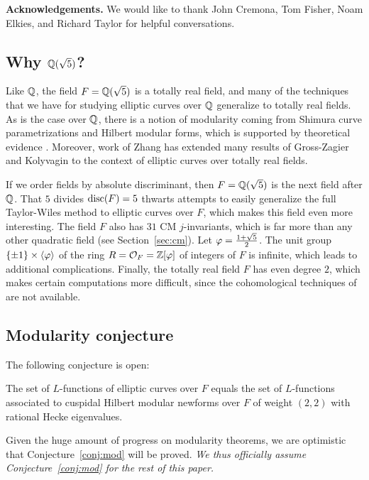 \documentclass{amsart}
\begin{document}
{\bf Acknowledgements.} We would like
to thank John Cremona, Tom Fisher, Noam Elkies, and Richard Taylor
for helpful conversations.
 
\subsection{Why $\mathbb{Q}(\sqrt{5})$?}

Like $\mathbb{Q}$, the field $F=\mathbb{Q}(\sqrt{5})$ is a totally real field, and
many of the techniques that we have for studying elliptic curves over
$\mathbb{Q}$ generalize to totally real
fields.
As is the case over $\mathbb{Q}$, there is a 
notion of modularity coming from Shimura curve
parametrizations and Hilbert modular forms, which is supported by
theoretical evidence \cite{}.%
Moreover,  work \cite{zhang:heightsshimura} of Zhang has extended many results
of Gross-Zagier \cite{gross-zagier} and Kolyvagin \cite{kolyvagin:mordellweil} 
to the context of elliptic curves over totally real fields.

If we order fields by absolute discriminant, then $F=\mathbb{Q}(\sqrt{5})$ is
the next field after $\mathbb{Q}$.  That $5$ divides $\operatorname{disc}(F)=5$ thwarts
attempts to easily generalize the full Taylor-Wiles method to elliptic
curves over $F$, which makes this field even more interesting.  The
field $F$ also has $31$ CM $j$-invariants, which is far more than any
other quadratic field (see Section~\ref{sec:cm}).  Let
$\varphi=\frac{1+\sqrt{5}}{2}$.  The unit group $\{\pm 1\} \times
\langle \varphi \rangle$ of the ring $R=\mathcal{O}_F=\mathbb{Z}[\varphi]$ of integers of
$F$ is infinite, which leads to additional complications.  Finally,
the totally real field $F$ has even degree $2$, which makes certain
computations more difficult, since the cohomological techniques of
\cite{greenberg-voight:shimura} are not available.


\subsection{Modularity conjecture}\label{sec:mod}
The following conjecture is open:
\begin{conjecture}[Modularity]\label{conj:mod}
  The set of $L$-functions of elliptic curves over $F$ equals the set
  of $L$-functions associated to cuspidal Hilbert modular newforms
  over $F$ of weight $(2,2)$ with rational Hecke eigenvalues.
\end{conjecture}
Given the huge amount of progress on modularity theorems, we are
optimistic that Conjecture~\ref{conj:mod} will be proved.  {\em We
  thus officially assume Conjecture~\ref{conj:mod} for the rest of
  this paper.}
\end{document}
